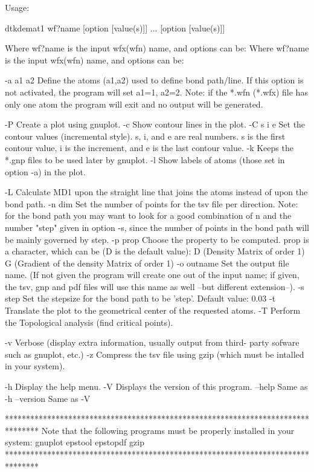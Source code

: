 

Usage:

	dtkdemat1 wf?name [option [value(s)]] ... [option [value(s)]]

Where wf?name is the input wfx(wfn) name, and options can be:
Where wf?name is the input wfx(wfn) name, and options can be:

  -a a1 a2  	Define the atoms  (a1,a2) used to define bond path/line.
            	  If this option is not activated, the program will 
            	  set a1=1, a2=2.
            	  Note: if the *.wfn (*.wfx) file has only one atom
            	  the program will exit and no output will be generated.

  -P        	Create a plot using gnuplot.
  -c        	Show contour lines in the plot.
  -C s i e  	Set the contour values (incremental style).
            	  s, i, and e are real numbers. s is the first
            	  contour value, i is the increment, and 
            	  e is the last contour value.
  -k     	Keeps the *.gnp files to be used later by gnuplot.
  -l     	Show labels of atoms (those set in option -a) in the plot.

  -L        	Calculate MD1 upon the straight line that joins the atoms
            	  instead of upon the bond path.
  -n  dim   	Set the number of points for the tsv file per direction.
            	  Note: for the bond path you may want to look for a good 
            	  combination of n and the number "step" given in option -s,
            	  since the number of points in the bond path will be mainly 
            	  governed by step.
  -p prop   	Choose the property to be computed. prop is a character,
            	  which can be (D is the default value):
            	      D (Density Matrix of order 1)
            	      G (Gradient of the density Matrix of order 1)
  -o outname	Set the output file name.
            	  (If not given the program will create one out of
            	  the input name; if given, the tsv, gnp and pdf files will
            	  use this name as well --but different extension--).
  -s step   	Set the stepsize for the bond path to be 'step'.
            	  Default value: 0.03
  -t        	Translate the plot to the geometrical center of the
            	  requested atoms.
  -T        	Perform the Topological analysis (find critical points).

  -v     	Verbose (display extra information, usually output from third-
         	  party sofware such as gnuplot, etc.)
  -z     	Compress the tsv file using gzip (which must be intalled
         	   in your system).

  -h     	Display the help menu.
  -V     	Displays the version of this program.
  --help    		Same as -h
  --version 		Same as -V

********************************************************************************
  Note that the following programs must be properly installed in your system:
                                    gnuplot
                                    epstool
                                    epstopdf
                                      gzip
********************************************************************************
